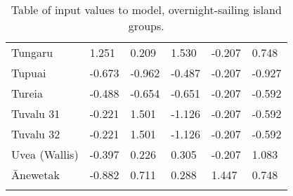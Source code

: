 \begin{longtable}{p{4.5cm}p{1.7cm}p{1.7cm}p{1.7cm}p{1.7cm}p{1.7cm}}
  Tungaru & 1.251 & 0.209 & 1.530 & -0.207 & 0.748 \\ 
  Tupuai & -0.673 & -0.962 & -0.487 & -0.207 & -0.927 \\ 
  Tureia & -0.488 & -0.654 & -0.651 & -0.207 & -0.592 \\ 
  Tuvalu 31 & -0.221 & 1.501 & -1.126 & -0.207 & -0.592 \\ 
  Tuvalu 32 & -0.221 & 1.501 & -1.126 & -0.207 & -0.592 \\ 
  Uvea (Wallis) & -0.397 & 0.226 & 0.305 & -0.207 & 1.083 \\ 
  Ānewetak & -0.882 & 0.711 & 0.288 & 1.447 & 0.748 \\ 
   \bottomrule
\caption{Table of input values to model, overnight-sailing island groups.} 
\label{appendix_SBZR_table}
\end{longtable}
